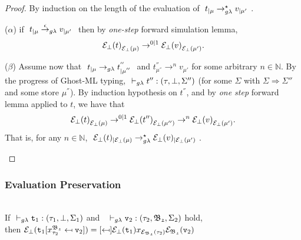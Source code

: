 \begin{proof}
By induction on the length of the evaluation of 
$~t_{|\mu} \rightarrow_{g\lambda}^{\star} v_{|\mu'} ~$.
\begin{adjustwidth}{1em}{-3em}

\noindent ($\alpha$) \quad 
 if $~t_{|\mu} \stackrel{\epsilon}{\rightarrow}_{g\lambda} v_{|\mu'} ~$ then 	
 by \textit{one-step} forward simulation lemma,\\ 
$${\mathcal{E}_{\bot}(t)}_{\mathcal{E}_{\bot}(\mu)} \rightarrow^{0|1} {\mathcal{E}_{\bot}(v)}_{\mathcal{E}_{\bot}(\mu')}.$$ 

\noindent ($\beta$) \quad Assume now that 
$~t_{|\mu} \rightarrow_{g\lambda} t^{''}_{|\mu^{''}} ~$ and  $t^{''}_{\mu^{''}} \rightarrow^{n} v_{\mu'}$
for some arbitrary $n \in \mathbb{N}$.
By the progress of Ghost-ML typing, 
$ \typrule{t''}{\tau}{\bot}{\Sigma''}$ (for some $\Sigma$ with $\Sigma \Rightarrow \Sigma''$ and some store $\mu^{''}$). By induction hypothesis 
on $t^{''}$, and by \textit{one step} forward lemma applied to $t$, 
we have that  
$${\mathcal{E}_{\bot}(t)}_{\mathcal{E}_{\bot}(\mu)} \rightarrow^{0|1} {\mathcal{E}_{\bot}(t'')}_{\mathcal{E}_{\bot}(\mu'')}
\rightarrow^{n} {\mathcal{E}_{\bot}(v)}_{\mathcal{E}_{\bot}(\mu')}.$$ That is, for any $n \in \mathbb{N}$, $~\mathcal{E}_{\bot}(t)_{|\mathcal{E}_{\bot}(\mu)} \rightarrow_{g\lambda}^{\star} \mathcal{E}_{\bot}(v)_{|\mathcal{E}_{\bot}(\mu')} ~$.
\end{adjustwidth}
\end{proof}




\subsubsection{Evaluation Preservation}
\begin{lemma} ~\\
If $\typrule
		{\texttt{t}_{1}}
		{\tau_{1}}
		{\bot}
		{\Sigma_1}$  
and 
	\mbox{
		$\typrule
			{\texttt{v}_{2}}
			{\tau_{2}}
			{\mf{B_{2}}}
			{\Sigma_2}$}	
hold, \\ 
then
$\e_{\bot}
	(\sbst
		{\texttt{t}_{1}}
		{x^{\mf{B_{2}}}_{\tau_{2}}}
		{\texttt{v}_{2}})
= \sbst
		{\e_{\bot}(\texttt{t}_{1})}
		{x_{\e_{\mf{B_{2}}}(\tau_{2})}}
		{\e_{\mf{B_{2}}}(\texttt{v}_{2})}$
\label{Substitution under erasure}
\end{lemma}

